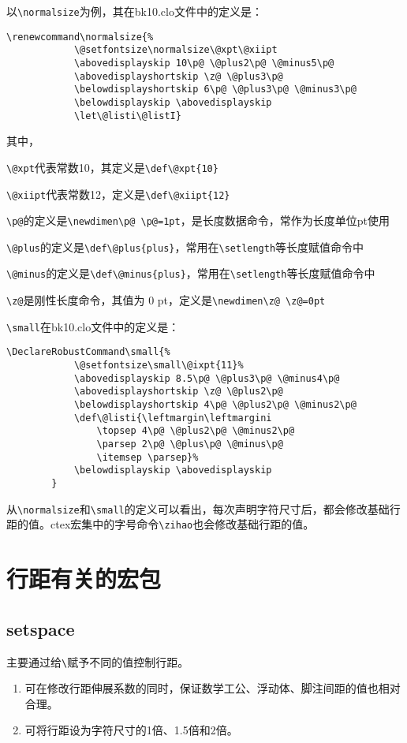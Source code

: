 \documentclass{ctexart}
\newcommand{\cmd}[1]{\texttt{\textbackslash #1}}
\begin{document}
	以\cmd{normalsize}为例，其在bk10.clo文件中的定义是：
	
	\begin{lstlisting}[caption= {\cmd{normalsize}命令的定义}]
		\renewcommand\normalsize{%
			\@setfontsize\normalsize\@xpt\@xiipt
			\abovedisplayskip 10\p@ \@plus2\p@ \@minus5\p@
			\abovedisplayshortskip \z@ \@plus3\p@
			\belowdisplayshortskip 6\p@ \@plus3\p@ \@minus3\p@
			\belowdisplayskip \abovedisplayskip
			\let\@listi\@listI}
	\end{lstlisting}
	
	其中，
	
	\cmd{@xpt}代表常数10，其定义是\lstinline|\def\@xpt{10}|
	
	\cmd{@xiipt}代表常数12，定义是\lstinline|\def\@xiipt{12}|
	
	\cmd{p@}的定义是\lstinline|\newdimen\p@ \p@=1pt|，是长度数据命令，常作为长度单位pt使用
	
	\cmd{@plus}的定义是\lstinline|\def\@plus{plus}|，常用在\cmd{setlength}等长度赋值命令中
	
	\cmd{@minus}的定义是\lstinline|\def\@minus{plus}|，常用在\cmd{setlength}等长度赋值命令中
	
	\cmd{z@}是刚性长度命令，其值为 0 pt，定义是\lstinline|\newdimen\z@ \z@=0pt|
	
	\cmd{small}在bk10.clo文件中的定义是：
	\begin{lstlisting}[caption= {\cmd{small}命令的定义}]
		\DeclareRobustCommand\small{%
			\@setfontsize\small\@ixpt{11}%
			\abovedisplayskip 8.5\p@ \@plus3\p@ \@minus4\p@
			\abovedisplayshortskip \z@ \@plus2\p@
			\belowdisplayshortskip 4\p@ \@plus2\p@ \@minus2\p@
			\def\@listi{\leftmargin\leftmargini
				\topsep 4\p@ \@plus2\p@ \@minus2\p@
				\parsep 2\p@ \@plus\p@ \@minus\p@
				\itemsep \parsep}%
			\belowdisplayskip \abovedisplayskip
		}
	\end{lstlisting}
	
	
	
	从\cmd{normalsize}和\cmd{small}的定义可以看出，每次声明字符尺寸后，都会修改基础行距的值。ctex宏集中的字号命令\cmd{zihao}也会修改基础行距的值。
	
	\section{行距有关的宏包}
	\subsection{setspace}
	主要通过给\cmd{\baselinestretch}赋予不同的值控制行距。
	\begin{enumerate}
		\item 可在修改行距伸展系数的同时，保证数学工公、浮动体、脚注间距的值也相对合理。
		\item 可将行距设为字符尺寸的1倍、1.5倍和2倍。
	\end{enumerate}
	
\end{document}
